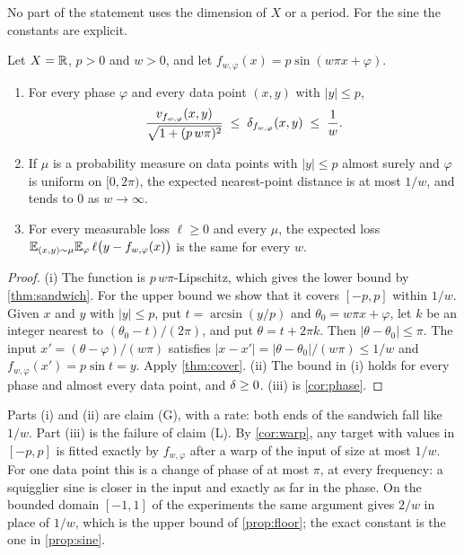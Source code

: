 No part of the statement uses the dimension of $X$ or a period. For the sine
the constants are explicit.

\begin{theorem}\label{thm:sine}
Let $X=\mathbb{R}$, $p>0$ and $w>0$, and let $f_{w,\varphi}(x)=p\sin(w\pi x+\varphi)$.
\begin{enumerate}\setlength{\itemsep}{0pt}
\item[(i)] For every phase $\varphi$ and every data point $(x,y)$ with
$|y|\le p$,
\[
  \frac{v_{f_{w,\varphi}}(x,y)}{\sqrt{1+(p\,w\pi)^2}}\;\le\;\delta_{f_{w,\varphi}}(x,y)\;\le\;\frac1w .
\]
\item[(ii)] If $\mu$ is a probability measure on data points with $|y|\le p$
almost surely and $\varphi$ is uniform on $[0,2\pi)$, the expected
nearest-point distance is at most $1/w$, and tends to $0$ as $w\to\infty$.
\item[(iii)] For every measurable loss $\ell\ge0$ and every $\mu$, the expected
loss $\mathbb{E}_{(x,y)\sim\mu}\mathbb{E}_\varphi\,\ell\bigl(y-f_{w,\varphi}(x)\bigr)$ is the
same for every $w$.
\end{enumerate}
\end{theorem}

\begin{proof}
(i) The function is $p\,w\pi$-Lipschitz, which gives the lower bound by
\cref{thm:sandwich}. For the upper bound we show that it covers $[-p,p]$ within
$1/w$. Given $x$ and $y$ with $|y|\le p$, put $t=\arcsin(y/p)$ and
$\theta_0=w\pi x+\varphi$, let $k$ be an integer nearest to
$(\theta_0-t)/(2\pi)$, and put $\theta=t+2\pi k$. Then $|\theta-\theta_0|\le\pi$.
The input $x'=(\theta-\varphi)/(w\pi)$ satisfies $|x-x'|=|\theta-\theta_0|/(w\pi)\le1/w$
and $f_{w,\varphi}(x')=p\sin t=y$. Apply \cref{thm:cover}.
(ii) The bound in (i) holds for every phase and almost every data point, and
$\delta\ge0$. (iii) is \cref{cor:phase}.
\end{proof}

Parts (i) and (ii) are claim (G), with a rate: both ends of the sandwich fall
like $1/w$. Part (iii) is the failure of claim (L). By \cref{cor:warp}, any
target with values in $[-p,p]$ is fitted exactly by $f_{w,\varphi}$ after a warp
of the input of size at most $1/w$. For one data point this is a change of
phase of at most $\pi$, at every frequency: a squigglier sine is closer in the
input and exactly as far in the phase. On the bounded domain
$[-1,1]$ of the experiments the same argument gives $2/w$ in place of $1/w$,
which is the upper bound of \cref{prop:floor}; the exact constant is the one in
\cref{prop:sine}.
